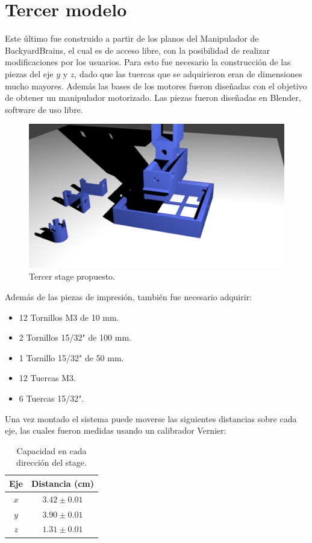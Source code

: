 \section{Tercer modelo}
Este último fue construido a partir de los planos del Manipulador de BackyardBrains, el cual es de acceso libre, con la posibilidad de realizar modificaciones por los usuarios. Para esto fue necesario la construcción de las piezas del eje $y$ y $z$, dado que las tuercas que se adquirieron eran de dimensiones mucho mayores. Además las bases de los motores fueron diseñadas con el objetivo de obtener un manipulador motorizado. Las piezas fueron diseñadas en Blender, software de uso libre.
\begin{figure}[h]
	\centering
	\includegraphics[width=0.9\linewidth]{figures/model3.png}	
	\caption{Tercer stage propuesto.}
	\label{fig:thirdsystem}
\end{figure}

Además de las piezas de impresión, también fue necesario adquirir:
\begin{itemize}
	\item 12 Tornillos M3 de 10 mm.
	\item 2 Tornillos 15/32" de 100 mm.
	\item 1 Tornillo 15/32" de 50 mm.
	\item 12 Tuercas M3.
	\item 6 Tuercas 15/32".
\end{itemize}

Una vez montado el sistema puede moverse las siguientes distancias sobre cada eje, las cuales fueron medidas usando un calibrador Vernier:
\newpage
\begin{table}[h]
	\centering
	\caption{Capacidad en cada dirección del stage.}
	\begin{tabular}{cc}
		\hline
		\textbf{Eje} & \textbf{Distancia (cm)} \\
		\hline
		$x$ & $3.42 \pm 0.01$ \\
		$y$ & $3.90 \pm 0.01$ \\
		$z$ & $1.31 \pm 0.01$ \\
		\hline		
	\end{tabular}
\end{table}



